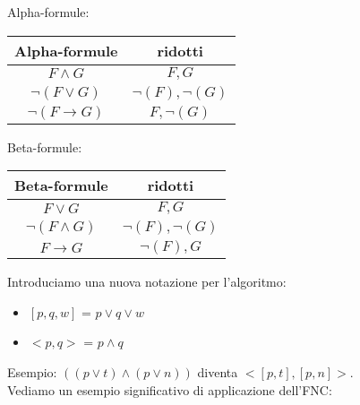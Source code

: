 \documentclass[11pt]{article}
\begin{document}
Alpha-formule:\\
\begin{center}
    \begin{tabular}{|c|c|}
        \hline
        Alpha-formule & ridotti\\
        \hline
        $F \land G$ & $F,G$\\
        \hline
        $\neg(F \lor G)$ & $\neg(F),\neg(G)$\\
        \hline
        $\neg(F \rightarrow G)$ & $F,\neg(G)$\\
        \hline
    \end{tabular}
\end{center}
Beta-formule:\\
\begin{center}
    \begin{tabular}{|c|c|}
        \hline
        Beta-formule & ridotti\\
        \hline
        $F \lor G$ & $F,G$\\
        \hline
        $\neg(F \land G)$ & $\neg(F),\neg(G)$\\
        \hline
        $F \rightarrow G$ & $\neg(F),G$\\
        \hline
    \end{tabular}
\end{center}


Introduciamo una nuova notazione per l'algoritmo:
\begin{itemize}
    \item $[p,q,w]$ = $p \lor q \lor w$
    \item $<p,q>$ = $p \land q$
\end{itemize}
Esempio: $((p \lor t) \land (p \lor n))$ diventa $<[p,t],[p,n]>$.\\

Vediamo un esempio significativo di applicazione dell'FNC:\\
\end{document}
